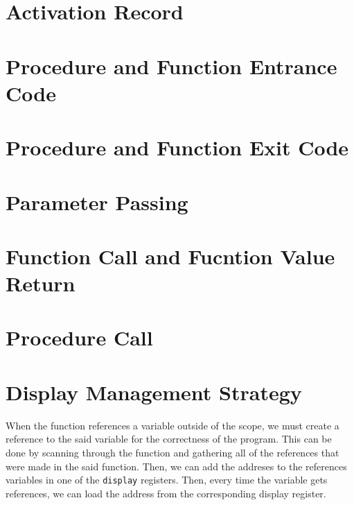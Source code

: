 \documentclass{article}
\begin{document}
\section{Activation Record}

\section{Procedure and Function Entrance Code}

\section{Procedure and Function Exit Code}

\section{Parameter Passing}

\section{Function Call and Fucntion Value Return}

\section{Procedure Call}

\section{Display Management Strategy}

When the function references a variable outside of the scope, we must create a reference to the said variable for the correctness of the program. This can be done by scanning through the function and gathering all of the references that were made in the said function. Then, we can add the addreses to the references variables in one of the {\tt display} registers. Then, every time the variable gets references, we can load the address from the corresponding display register.

\end{document}
